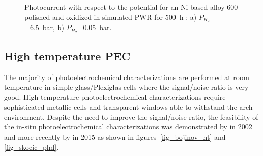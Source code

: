 \begin{figure}[h]
        \caption{Photocurrent with respect to the potential for an 
        Ni-based alloy 600 polished and oxidized in simulated PWR 
        for 500~h \citep{loucif2013}: a) $P_{H_2}$=6.5~bar, b) $P_{H_2}$=0.05~bar.}
        \label{fig_loucif_sctype}
    \end{figure}



\subsection{High temperature PEC}
    The majority of photoelectrochemical characterizations are performed at 
    room temperature in simple glass/Plexiglas cells where the signal/noise 
    ratio is very good. High temperature photoelectrochemical characterizations 
    require sophisticated metallic cells and transparent windows 
    able to withstand the arch environment. 
    Despite the need to improve the signal/noise ratio, the feasibility of 
    the in-situ photoelectrochemical characterizations was demonstrated by 
    \citet{bojinov2002} in 2002 and more recently by \citet{skocic2016} in 2015 
    as shown in figures~\ref{fig_bojinov_ht} and \ref{fig_skocic_phd}.

